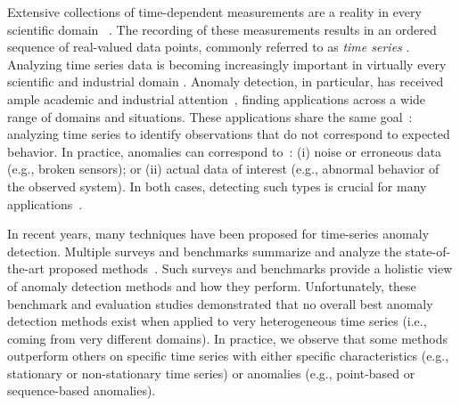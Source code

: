 Extensive collections of time-dependent measurements are a reality in every scientific domain ~\cite{Palpanas2015,DBLP:journals/dagstuhl-reports/BagnallCPZ19, Palpanas2019, paparrizos2021vergedb, liu2023amir,paparrizos2018fastthesis}. 
The recording of these measurements results in an ordered sequence of real-valued data points, commonly referred to as {\em time series} \cite{paparrizos2015k,paparrizos2017fast,bariya2021k,paparrizos2022fast,paparrizos2023accelerating}. 
Analyzing time series data is becoming increasingly important in virtually every scientific and industrial domain \cite{DBLP:conf/edbt/EchihabiZP21,DBLP:journals/pvldb/EchihabiPZ21,liu2021decomposed,jiang2020pids,jiang2021good,dziedzic2019band,paparrizos2019grail,paparrizos2020debunking,paparrizos2016detecting,paparrizos2016screening,mckeown2016predicting,goel2016social,DBLP:journals/pvldb/0003WNP22,DBLP:conf/eenergy/PetraliaCBP23}. 
Anomaly detection, in particular, has received ample academic and industrial attention~\cite{page1957problems,fox1972outliers}, %
finding applications across a wide range of domains and situations. These applications share the same goal~\cite{statisticaloutliers, DBLP:conf/vldb/SubramaniamPPKG06, DBLP:conf/icdm/YehZUBDDSMK16}: analyzing time series to identify observations that do not correspond to %
expected behavior. %
In practice, anomalies can correspond to~\cite{aggarwal2017introduction}: (i) noise or erroneous data (e.g., broken sensors); or (ii) actual data of interest (e.g., abnormal behavior of the observed system). In both cases, detecting such types is crucial for many applications~\cite{IMSGroundtruth, DBLP:conf/healthcom/HadjemNK16}.


In recent years, many techniques have been proposed for time-series anomaly detection. Multiple surveys and benchmarks summarize and analyze the state-of-the-art proposed methods~\cite{blazquez2021review,10.14778/3529337.3529354,10.14778/3538598.3538602,10.14778/3551793.3551830,10.14778/3476249.3476307,wu2020current,7424283,jacob2020exathlon,Kim2021TowardsAR}. Such surveys and benchmarks provide a holistic view of anomaly detection methods and how they perform. Unfortunately, these benchmark and evaluation studies demonstrated that no overall best anomaly detection methods exist when applied to very heterogeneous time series (i.e., coming from very different domains). In practice, we observe that some methods outperform others on specific time series with either specific characteristics (e.g., stationary or non-stationary time series) or anomalies (e.g., point-based or sequence-based anomalies). 


